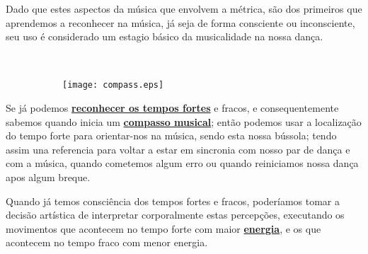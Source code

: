 Dado que estes aspectos da música que envolvem a métrica, são dos primeiros que aprendemos a reconhecer na música,
já seja de forma consciente ou inconsciente,
seu uso é considerado um estagio básico da musicalidade na nossa dança.
 
\begin{example}~\\
\noindent
\begin{minipage}[t]{0.25\linewidth}
\begin{figure}[H]
  \centering
  \begin{subfigure}[t]{0.9\linewidth}
    \texttt{[image: compass.eps]}
  \end{subfigure}
\end{figure}
\end{minipage}
\begin{minipage}[t]{0.75\linewidth}
Se já podemos \hyperref[subsec:perceberTF1]{\textbf{reconhecer os tempos fortes}} e fracos, 
e consequentemente sabemos quando inicia um \hyperref[sec:compaso]{\textbf{compasso musical}};
então podemos usar a localização do tempo forte para orientar-nos na música,
sendo esta nossa bússola;
tendo assim una referencia para voltar a estar em sincronia com  nosso par de dança e com a música, 
quando cometemos algum erro ou quando reiniciamos nossa dança apos algum breque.
\end{minipage}
\end{example}


\begin{example}
Quando já temos consciência dos tempos fortes e fracos,
poderíamos tomar a decisão artística de interpretar corporalmente estas percepções, 
executando os movimentos que acontecem no tempo forte com maior \hyperref[sec:musicalidadenergia]{\textbf{energia}},
e os que acontecem no tempo fraco com menor energia.
\end{example}

